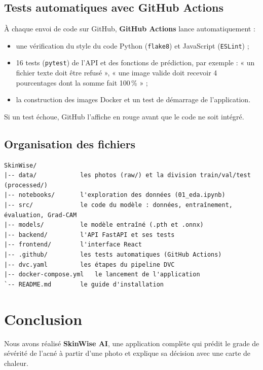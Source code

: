 \documentclass[11pt,a4paper]{report}
\begin{document}
\section{Tests automatiques avec GitHub Actions}

À chaque envoi de code sur GitHub, \textbf{GitHub Actions} lance automatiquement :
\begin{itemize}[noitemsep,topsep=4pt]
    \item une vérification du style du code Python (\texttt{flake8}) et JavaScript (\texttt{ESLint}) ;
    \item 16 tests (\texttt{pytest}) de l'API et des fonctions de prédiction, par exemple : « un fichier texte doit être refusé », « une image valide doit recevoir 4 pourcentages dont la somme fait 100\,\% » ;
    \item la construction des images Docker et un test de démarrage de l'application.
\end{itemize}

\noindent Si un test échoue, GitHub l'affiche en rouge avant que le code ne soit intégré.

\section{Organisation des fichiers}

\begin{lstlisting}[caption={Les dossiers principaux du projet.}]
SkinWise/
|-- data/            les photos (raw/) et la division train/val/test (processed/)
|-- notebooks/       l'exploration des données (01_eda.ipynb)
|-- src/             le code du modèle : données, entraînement, évaluation, Grad-CAM
|-- models/          le modèle entraîné (.pth et .onnx)
|-- backend/         l'API FastAPI et ses tests
|-- frontend/        l'interface React
|-- .github/         les tests automatiques (GitHub Actions)
|-- dvc.yaml         les étapes du pipeline DVC
|-- docker-compose.yml   le lancement de l'application
`-- README.md        le guide d'installation
\end{lstlisting}

\chapter*{Conclusion}

Nous avons réalisé \textbf{SkinWise AI}, une application complète qui prédit le grade de
sévérité de l'acné à partir d'une photo et explique sa décision avec une carte de chaleur.
\end{document}
